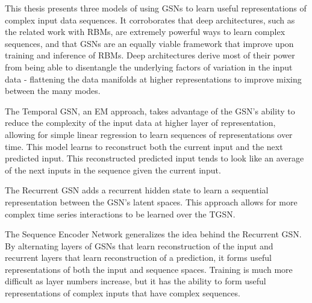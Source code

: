 This thesis presents three models of using GSNs to learn useful representations of complex input data sequences. It corroborates that deep architectures, such as the related work with RBMs, are extremely powerful ways to learn complex sequences, and that GSNs are an equally viable framework that improve upon training and inference of RBMs. Deep architectures derive most of their power from being able to disentangle the underlying factors of variation in the input data - flattening the data manifolds at higher representations to improve mixing between the many modes.

The Temporal GSN, an EM approach, takes advantage of the GSN's ability to reduce the complexity of the input data at higher layer of representation, allowing for simple linear regression to learn sequences of representations over time. This model learns to reconstruct both the current input and the next predicted input. This reconstructed predicted input tends to look like an average of the next inputs in the sequence given the current input.

The Recurrent GSN adds a recurrent hidden state to learn a sequential representation between the GSN's latent spaces. This approach allows for more complex time series interactions to be learned over the TGSN.

The Sequence Encoder Network generalizes the idea behind the Recurrent GSN. By alternating layers of GSNs that learn reconstruction of the input and recurrent layers that learn reconstruction of a prediction, it forms useful representations of both the input and sequence spaces. Training is much more difficult as layer numbers increase, but it has the ability to form useful representations of complex inputs that have complex sequences.